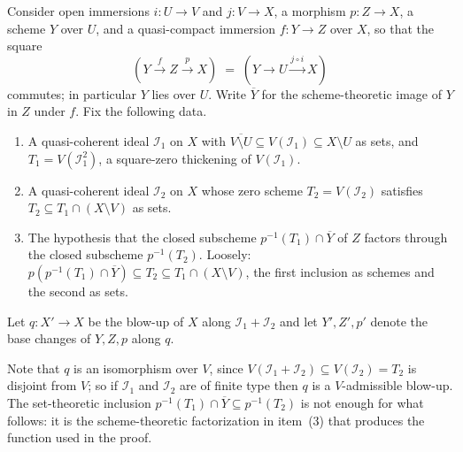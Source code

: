\begin{definition}
  \label{def:nagata-conrad-disjointness-setup}

  Consider open immersions $i\colon U\to V$ and $j\colon V\to X$, a morphism
  $p\colon Z\to X$, a scheme $Y$ over $U$, and a quasi-compact immersion
  $f\colon Y\to Z$ over $X$, so that the square
  \[
    (Y\xrightarrow{f}Z\xrightarrow{p}X)
      \;=\;(Y\to U\xrightarrow{j\circ i}X)
  \]
  commutes; in particular $Y$ lies over $U$.  Write $\overline Y$ for the scheme-theoretic image of $Y$ in $Z$
  under $f$.  Fix the following data.
  \begin{enumerate}
    \item A quasi-coherent ideal $\mathcal I_1$ on $X$ with
      $\overline{V\setminus U}\subseteq V(\mathcal I_1)\subseteq X\setminus U$
      as sets, and $T_1=V(\mathcal I_1^2)$, a square-zero thickening of
      $V(\mathcal I_1)$.
    \item A quasi-coherent ideal $\mathcal I_2$ on $X$ whose zero scheme
      $T_2=V(\mathcal I_2)$ satisfies $T_2\subseteq T_1\cap(X\setminus V)$ as
      sets.
    \item The hypothesis that the closed subscheme
      $p^{-1}(T_1)\cap\overline Y$ of $Z$ factors through the closed
      subscheme $p^{-1}(T_2)$.  Loosely: $p(p^{-1}(T_1)\cap\overline Y)
      \subseteq T_2\subseteq T_1\cap(X\setminus V)$, the first inclusion as
      schemes and the second as sets.
  \end{enumerate}
  Let $q\colon X'\to X$ be the blow-up of $X$ along $\mathcal I_1+\mathcal I_2$
  and let $Y',Z',p'$ denote the base changes of $Y,Z,p$ along $q$.
\end{definition}

Note that $q$ is an isomorphism over $V$, since
$V(\mathcal I_1+\mathcal I_2)\subseteq V(\mathcal I_2)=T_2$ is disjoint from
$V$; so if $\mathcal I_1$ and $\mathcal I_2$ are of finite type then $q$ is a
$V$-admissible blow-up.  The set-theoretic inclusion
$p^{-1}(T_1)\cap\overline Y\subseteq p^{-1}(T_2)$ is not enough for what
follows: it is the scheme-theoretic factorization in item~(3) that produces the
function used in the proof.

